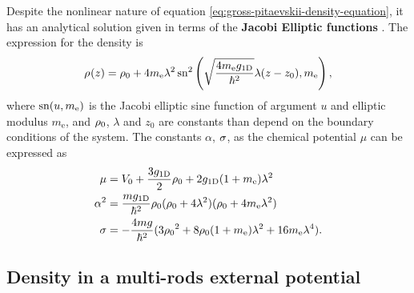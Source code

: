 Despite the nonlinear nature of equation \eqref{eq:gross-pitaevskii-density-equation}, it has an analytical
solution given in terms of the \textbf{Jacobi Elliptic functions} \cite{bib:abramowitz-stegun-1965}. The
expression for the density is
%
\begin{equation}
	\label{eq:gross-pitaevskii-density}
	\gprho(z) = \gprho[0] + 4 \ellipm \lambda^2 \, \jacobisn^2 \left( \sqrt{\frac{4 m_{\mathrm{e}} \gonedim}{\hbar^2}} \lambda (z - z_0), m_{\mathrm{e}}\right),
\end{equation}
%
where $\jacobisn(u, m_{\mathrm{e}})$ is the Jacobi elliptic sine function of argument $u$ and
elliptic modulus $m_{\mathrm{e}}$, and $\gprho[0]$, $\lambda$ and $z_0$ are constants than
depend on the boundary conditions of the system. The constants $\alpha$, $\gpgamma$, as the chemical potential $\mu$ can be expressed as
%
\begin{align}
	\mu &= V_0 + \frac{3 \gonedim}{2} \gprho[0] + 2 \gonedim (1 + \ellipm) \lambda^2 \\
	\alpha^2 &= \frac{m \gonedim}{\hbar^2} \gprho[0] (\gprho[0] + 4 \lambda^2) (\gprho[0] + 4 \ellipm \lambda^2) \\
	\gpgamma &= -\frac{4mg}{\hbar^2} (3 \gprho[0]^2 + 8 \gprho[0] (1 + \ellipm) \lambda^2 + 16 \ellipm[] \lambda^4).
\end{align}



\subsection{Density in a multi-rods external potential}


